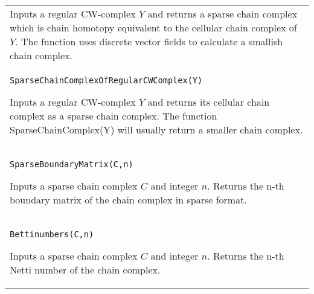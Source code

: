 \documentclass[a4paper,11pt]{report}
\begin{document}
{\begin{center}
\begin{tabular}{|l|}
 Inputs a regular CW-complex $Y$ and returns a sparse chain complex which is chain homotopy equivalent to the
cellular chain complex of $Y$. The function uses discrete vector fields to calculate a smallish chain
complex. \\
 \index{SparseChainComplexOfRegularCWComplex} \texttt{SparseChainComplexOfRegularCWComplex(Y)} 

 Inputs a regular CW-complex $Y$ and returns its cellular chain complex as a sparse chain complex. The function
SparseChainComplex(Y) will usually return a smaller chain complex. \\
 \index{SparseBoundaryMatrix} \texttt{SparseBoundaryMatrix(C,n)} 

 Inputs a sparse chain complex $C$ and integer $n$. Returns the n-th boundary matrix of the chain complex in sparse format. \\
 \index{Bettinumbers} \texttt{Bettinumbers(C,n)} 

 Inputs a sparse chain complex $C$ and integer $n$. Returns the n-th Netti number of the chain complex. \\
\end{tabular}\\[2mm]
\end{center}

 }

 
\end{document}
